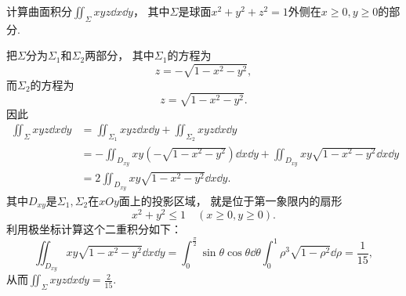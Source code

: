 \begin{example}
计算曲面积分\(\iint_\Sigma xyz \dd{x}\dd{y}\)，
其中\(\Sigma\)是球面\(x^2+y^2+z^2=1\)外侧在\(x\geq0,y\geq0\)的部分.
\begin{solution}
把\(\Sigma\)分为\(\Sigma_1\)和\(\Sigma_2\)两部分，
其中\(\Sigma_1\)的方程为\begin{equation*}
	z = -\sqrt{1-x^2-y^2},
\end{equation*}
而\(\Sigma_2\)的方程为\begin{equation*}
	z = \sqrt{1-x^2-y^2}.
\end{equation*}
因此\begin{align*}
	\iint_\Sigma xyz \dd{x}\dd{y}
	&= \iint_{\Sigma_1} xyz \dd{x}\dd{y}
	+ \iint_{\Sigma_2} xyz \dd{x}\dd{y} \\
	&= -\iint_{D_{xy}} xy (-\sqrt{1-x^2-y^2}) \dd{x}\dd{y}
	+ \iint_{D_{xy}} xy \sqrt{1-x^2-y^2} \dd{x}\dd{y} \\
	&= 2 \iint_{D_{xy}} xy \sqrt{1-x^2-y^2} \dd{x}\dd{y}.
\end{align*}
其中\(D_{xy}\)是\(\Sigma_1,\Sigma_2\)在\(xOy\)面上的投影区域，
就是位于第一象限内的扇形\begin{equation*}
	x^2+y^2\leq1 \quad(x\geq0,y\geq0).
\end{equation*}
利用极坐标计算这个二重积分如下：\begin{equation*}
	\iint_{D_{xy}} xy \sqrt{1-x^2-y^2} \dd{x}\dd{y}
	= \int_0^{\frac\pi2} \sin\theta \cos\theta \dd{\theta}
		\int_0^1 \rho^3 \sqrt{1-\rho^2} \dd{\rho}
	= \frac{1}{15},
\end{equation*}
从而\(\iint_\Sigma xyz \dd{x}\dd{y} = \frac{2}{15}\).
\end{solution}
\end{example}

